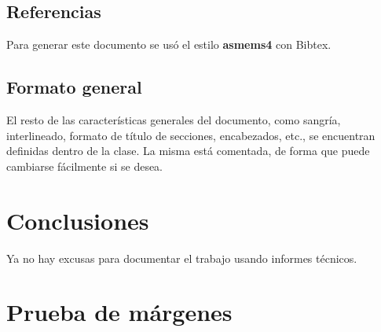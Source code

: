 \documentclass[a4paper,11pt,twoside]{MECOM}
\begin{document}
    
    \subsection{Referencias}
    Para generar este documento se us\'o el estilo {\bf asmems4} con Bibtex.
    
    \subsection{Formato general}
    El resto de las caracter\'isticas generales del documento, como sangr\'ia, interlineado, formato de t\'itulo de secciones, encabezados, etc., se encuentran definidas dentro de la clase. La misma est\'a comentada, de forma que puede cambiarse f\'acilmente si se desea.
    
    
    \section{Conclusiones}
    Ya no hay excusas para documentar el trabajo usando informes t\'ecnicos.
    
    
    
    
    
    
    \newpage
    \section{Prueba de m\'argenes} \blindtext[11]    
    
\end{document}
